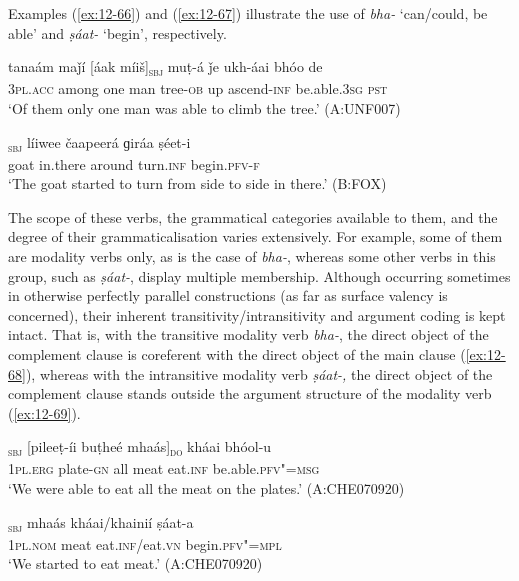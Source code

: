 Examples (\ref{ex:12-66}) and (\ref{ex:12-67}) illustrate the use of \textit{bha-} `can/could, be able' and \textit{ṣáat-} `begin', respectively.
\begin{exe}
\ex
\label{ex:12-66}
\gll tanaám maǰí [áak míiš]\textsubscript{\textsc{sbj}} muṭ-á ǰe ukh-áai bhóo de \\
\textsc{3pl.acc} among one man tree-\textsc{ob} up ascend-\textsc{inf}  be.able.\textsc{3sg} \textsc{pst} \\
\glt `Of them only one man was able to climb the tree.' (A:UNF007)
\end{exe}
\begin{exe}
\ex
\label{ex:12-67}
\gll [čhéeli]\textsubscript{\textsc{sbj}} líiwee čaapeerá ɡiráa ṣéet-i \\
goat in.there around turn.\textsc{inf} begin.\textsc{pfv-f} \\
\glt `The goat started to turn from side to side in there.' (B:FOX)
\end{exe}

The scope of these verbs, the grammatical categories available to them, and the degree of their grammaticalisation varies extensively. For example, some of them are modality verbs only, as is the case of \textit{bha-}, whereas some other verbs in this group, such as \textit{ṣáat-}, display multiple membership. Although occurring sometimes in otherwise perfectly parallel constructions (as far as surface valency is concerned), their inherent transitivity/intransitivity and argument coding is kept intact. That is, with the transitive modality verb \textit{bha-}, the direct object of the complement clause is coreferent with the direct object of the main clause (\ref{ex:12-68}), whereas with the intransitive modality verb \textit{ṣáat-,} the direct object of the complement clause stands outside the argument structure of the modality verb (\ref{ex:12-69}).

\begin{exe}
\ex
\label{ex:12-68}
\gll [asím]\textsubscript{\textsc{sbj}} [pileeṭ-íi buṭheé mhaás]\textsubscript{\textsc{do}} kháai bhóol-u \\
\textsc{1pl.erg} plate-\textsc{gn} all meat eat.\textsc{inf} be.able.\textsc{pfv"=msg} \\
\glt `We were able to eat all the meat on the plates.' (A:CHE070920)
\end{exe}
\begin{exe}
\ex
\label{ex:12-69}
\gll [be]\textsubscript{\textsc{sbj}} mhaás kháai/khainií ṣáat-a \\
\textsc{1pl.nom} meat eat.\textsc{inf}/eat.\textsc{vn} begin.\textsc{pfv"=mpl} \\
\glt `We started to eat meat.' (A:CHE070920)
\end{exe}

